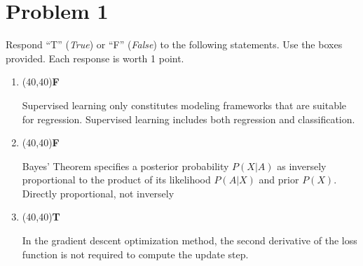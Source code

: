 \documentclass[11pt,twoside]{article}
\newcommand{\?}{\stackrel{?}{=}}
\newcommand{\bl}{\color{blue}}
\begin{document}
\section*{Problem 1 }
Respond ``T'' ({\it True})  or  ``F'' (\textit{False}) to the following statements. Use the boxes provided. Each response is worth 1 point.

\bigskip

\begin{enumerate}[\bf (i)]

\item \hfill
  \begin{minipage}{.1\linewidth}
    \framebox(40,40){\bf \bl F} %
  \end{minipage}\quad
  \begin{minipage}{.85\linewidth}
    Supervised learning only constitutes modeling frameworks that are suitable for regression. {\bl Supervised learning includes both regression and classification.}
  \end{minipage}

  \smallskip

  \item \hfill
  \begin{minipage}{.1\linewidth}
    \framebox(40,40){\bf\bl F} %
  \end{minipage}\quad
  \begin{minipage}{.85\linewidth}
    Bayes' Theorem specifies a posterior probability $P(X|A)$ as inversely proportional to the product of its likelihood
    $P(A|X)$ and prior $P(X)$. {\bl Directly proportional, not inversely}
  \end{minipage}

  \smallskip  
  
  \item \hfill
  \begin{minipage}{.1\linewidth}
    \framebox(40,40){\bf\bl T} %
  \end{minipage}\quad
  \begin{minipage}{.85\linewidth}
    In the gradient descent optimization method, the second derivative of the loss function is not required to compute
    the update step.
  \end{minipage}

  


\end{enumerate}
\end{document}
